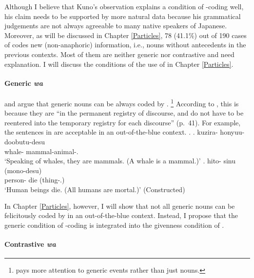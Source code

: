 Although I believe that Kuno's observation explains
a condition of -coding well,
his claim needs to be supported by more natural data
because his grammatical judgements are not always agreeable to many native speakers of Japanese.
Moreover,
as will be discussed in Chapter \ref{Particles},
78 (41.1\%) out of 190 cases of  codes new (non-anaphoric) information, i.e., nouns without antecedents in the previous contexts. 
Most of them are neither generic nor contrastive and need explanation.
I will discuss the conditions of the use of 
in Chapter \ref{Particles}.


\paragraph{Generic \textit{wa}}

 and  argue that
generic nouns can be always coded by .%
 \footnote{
  pays more attention to generic events rather than
 just nouns.
 }
According to ,
this is because they are ``in the permanent registry of discourse,
and do not have to be reentered into the temporary registry for each discourse'' (p.~41).
For example, the sentences in \Next are acceptable in an out-of-the-blue context.
%
\ex.
 \ag. kuzira- honyuu-doobutu-desu \\
      whale- mammal-animal-. \\
      `Speaking of whales, they are mammals. (A whale is a mammal.)'
      \hfill{\cite[44]{kuno73}}
 \bg. hito- sinu (mono-desu) \\
      person- die (thing-.)\\
      `Human beings die. (All humans are mortal.)'
      \hfill{(Constructed)}


In Chapter \ref{Particles}, however,
I will show that not all generic nouns can be felicitously coded by  in an out-of-the-blue context.
Instead, I propose that
the generic condition of -coding is integrated into
the givenness condition of .


\paragraph{Contrastive \textit{wa}}

